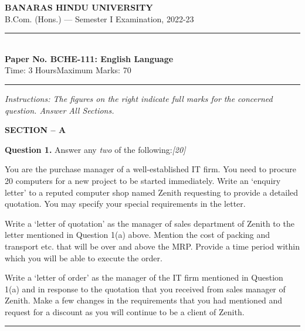 \documentclass[11pt,a4paper]{article}
\newcommand{\pts}[1]{\hfill   \textit{[#1]}}
\begin{document}
\begin{center}
  {\large\bfseries BANARAS HINDU UNIVERSITY}\\[2pt]
  {\normalsize B.Com. (Hons.) --- Semester I Examination, 2022-23}\\[6pt]
  \rule{0.8\linewidth}{0.5pt}\\[6pt]
  {\large\bfseries Paper No. BCHE-111: English Language}\\[4pt]
  {\normalsize Time: 3 Hours\hfill Maximum Marks: 70}
\end{center}

\rule{\linewidth}{0.4pt}

\smallskip



\noindent   \textit{Instructions: The figures on the right indicate full marks for the concerned question. Answer All Sections.}

\bigskip


\begin{center}
  {\bfseries SECTION -- A}
\end{center}




\noindent   \textbf{Question 1.}
Answer any   \textit{two} of the following:\pts{20}

\begin{parts}
  \item You are the purchase manager of a well-established IT firm. You need to procure 20 computers for a new project to be started immediately. Write an `enquiry letter' to a reputed computer shop named Zenith requesting to provide a detailed quotation. You may specify your special requirements in the letter.
  \item Write a `letter of quotation' as the manager of sales department of Zenith to the letter mentioned in Question 1(a) above. Mention the cost of packing and transport etc. that will be over and above the MRP. Provide a time period within which you will be able to execute the order.
  \item Write a `letter of order' as the manager of the IT firm mentioned in Question 1(a) and in response to the quotation that you received from sales manager of Zenith. Make a few changes in the requirements that you had mentioned and request for a discount as you will continue to be a client of Zenith.
\end{parts}

\medskip\rule{\linewidth}{0.2pt}
\end{document}
